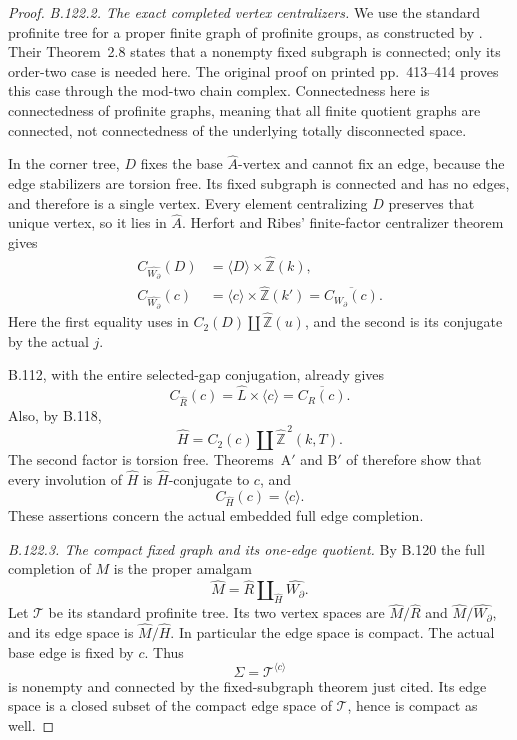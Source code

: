 \begin{proof}
\emph{B.122.2. The exact completed vertex centralizers.}
We use the standard profinite tree for a proper finite graph of
profinite groups, as constructed by
\citet[Proposition~3.8]{B_ZalesskiiMelnikov1989}. Their
Theorem~2.8 states that a nonempty fixed subgraph is connected;
only its order-two case is needed here. The original proof on
printed pp.~413--414 proves this case through the mod-two chain
complex. Connectedness here is connectedness of profinite graphs,
meaning that all finite quotient graphs are connected, not
connectedness of the underlying totally disconnected space.

In the corner tree, $D$ fixes the base $\widehat A$-vertex and
cannot fix an edge, because the edge stabilizers are torsion free.
Its fixed subgraph is connected and has no edges, and therefore
is a single vertex. Every element centralizing $D$ preserves that
unique vertex, so it lies in $\widehat A$. Herfort and Ribes'
finite-factor centralizer theorem gives
\begin{equation}\label{eq:B122-corner-centralizers}
 \begin{aligned}
 C_{\widehat{W_{\partial}}}(D)
   &=\langle D\rangle\times\widehat{\mathbb Z}(k),\\
 C_{\widehat{W_{\partial}}}(c)
   &=\langle c\rangle\times\widehat{\mathbb Z}(k')
     =\overline{C_{W_{\partial}}(c)}.
 \end{aligned}
\end{equation}
Here the first equality uses
\citet[Theorem~B$'$]{A_HR1985} in
$C_2(D)\amalg\widehat{\mathbb Z}(u)$, and the second is its
conjugate by the actual $j$.

B.112, with the entire selected-gap conjugation, already gives
\begin{equation}\label{eq:B122-regional-centralizer}
 C_{\widehat R}(c)=\widehat L\times\langle c\rangle
                 =\overline{C_R(c)}.
\end{equation}
Also, by B.118,
\[
 \widehat H=C_2(c)\amalg\widehat{\mathbb Z}^{\,2}(k,T).
\]
The second factor is torsion free. Theorems~A$'$ and B$'$ of
\citet{A_HR1985} therefore show that every involution of
$\widehat H$ is $\widehat H$-conjugate to $c$, and
\begin{equation}\label{eq:B122-edge-centralizer}
 C_{\widehat H}(c)=\langle c\rangle.
\end{equation}
These assertions concern the actual embedded full edge completion.

\emph{B.122.3. The compact fixed graph and its one-edge quotient.}
By B.120 the full completion of $M$ is the proper amalgam
\[
 \widehat M=\widehat R\amalg_{\widehat H}
                         \widehat{W_{\partial}}.
\]
Let $\mathscr T$ be its standard profinite tree. Its two vertex
spaces are $\widehat M/\widehat R$ and
$\widehat M/\widehat{W_{\partial}}$, and its edge space is
$\widehat M/\widehat H$. In particular the edge space is compact.
The actual base edge is fixed by $c$. Thus
\[
 \Sigma=\mathscr T^{\langle c\rangle}
\]
is nonempty and connected by the fixed-subgraph theorem just cited.
Its edge space is a closed subset of the compact edge space of
$\mathscr T$, hence is compact as well.


\end{proof}
